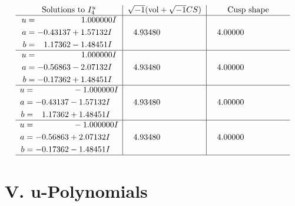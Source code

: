 \documentclass[1p]{elsarticle_modified}
\theoremstyle{definition}
\newcommand{\I}{\sqrt{-1}}
\begin{document}
$$\begin{array}{c|c|c}  
\text{Solutions to }I^u_{4}& \I (\text{vol} + \sqrt{-1}CS) & \text{Cusp shape}\\
 \hline 
\begin{aligned}
u &= \phantom{-0.000000 -}1.000000 I \\
a &= -0.43137 + 1.57132 I \\
b &= \phantom{-}1.17362 - 1.48451 I\end{aligned}
 & \phantom{-}4.93480\phantom{ +0.000000I} & \phantom{-}4.00000\phantom{ +0.000000I} \\ \hline\begin{aligned}
u &= \phantom{-0.000000 -}1.000000 I \\
a &= -0.56863 - 2.07132 I \\
b &= -0.17362 + 1.48451 I\end{aligned}
 & \phantom{-}4.93480\phantom{ +0.000000I} & \phantom{-}4.00000\phantom{ +0.000000I} \\ \hline\begin{aligned}
u &= \phantom{-0.000000 } -1.000000 I \\
a &= -0.43137 - 1.57132 I \\
b &= \phantom{-}1.17362 + 1.48451 I\end{aligned}
 & \phantom{-}4.93480\phantom{ +0.000000I} & \phantom{-}4.00000\phantom{ +0.000000I} \\ \hline\begin{aligned}
u &= \phantom{-0.000000 } -1.000000 I \\
a &= -0.56863 + 2.07132 I \\
b &= -0.17362 - 1.48451 I\end{aligned}
 & \phantom{-}4.93480\phantom{ +0.000000I} & \phantom{-}4.00000\phantom{ +0.000000I}\\
 \hline 
 \end{array}$$\newpage
\newpage\renewcommand{\arraystretch}{1}
\centering \section*{ V. u-Polynomials}
\end{document}
